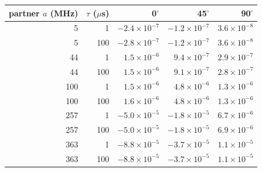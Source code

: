 \begin{tabular}{rrrrr}
\toprule
partner $a$ (MHz) & $\tau$ ($\mu$s) & 0$^\circ$ & 45$^\circ$ & 90$^\circ$ \\
\midrule
5 & 1 & $\ensuremath{-2.4\times10^{-7}}$ & $\ensuremath{-1.2\times10^{-7}}$ & $\ensuremath{3.6\times10^{-8}}$ \\
5 & 100 & $\ensuremath{-2.8\times10^{-7}}$ & $\ensuremath{-1.2\times10^{-7}}$ & $\ensuremath{3.6\times10^{-8}}$ \\
44 & 1 & $\ensuremath{1.5\times10^{-6}}$ & $\ensuremath{9.4\times10^{-7}}$ & $\ensuremath{2.9\times10^{-7}}$ \\
44 & 100 & $\ensuremath{1.5\times10^{-6}}$ & $\ensuremath{9.1\times10^{-7}}$ & $\ensuremath{2.8\times10^{-7}}$ \\
100 & 1 & $\ensuremath{1.5\times10^{-6}}$ & $\ensuremath{4.8\times10^{-6}}$ & $\ensuremath{1.3\times10^{-6}}$ \\
100 & 100 & $\ensuremath{1.6\times10^{-6}}$ & $\ensuremath{4.8\times10^{-6}}$ & $\ensuremath{1.3\times10^{-6}}$ \\
257 & 1 & $\ensuremath{-5.0\times10^{-5}}$ & $\ensuremath{-1.8\times10^{-5}}$ & $\ensuremath{6.7\times10^{-6}}$ \\
257 & 100 & $\ensuremath{-5.0\times10^{-5}}$ & $\ensuremath{-1.8\times10^{-5}}$ & $\ensuremath{6.9\times10^{-6}}$ \\
363 & 1 & $\ensuremath{-8.8\times10^{-5}}$ & $\ensuremath{-3.7\times10^{-5}}$ & $\ensuremath{1.1\times10^{-5}}$ \\
363 & 100 & $\ensuremath{-8.8\times10^{-5}}$ & $\ensuremath{-3.7\times10^{-5}}$ & $\ensuremath{1.1\times10^{-5}}$ \\
\bottomrule
\end{tabular}
